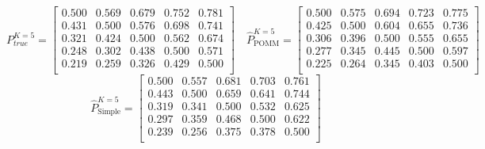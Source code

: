 \documentclass[11pt]{amsart}
\begin{document}
\[
P^{K=5}_{true} = 
\left[\begin{array}{ccccc}
0.500 & 0.569 & 0.679 & 0.752 & 0.781 \\
0.431 & 0.500 & 0.576 & 0.698 & 0.741 \\
0.321 & 0.424 & 0.500 & 0.562 & 0.674 \\
0.248 & 0.302 & 0.438 & 0.500 & 0.571 \\
0.219 & 0.259 & 0.326 & 0.429 & 0.500 \\
\end{array}\right] \quad   
\hat{P}^{K=5}_{\text{POMM}} = 
\left[\begin{array}{ccccc}
0.500 & 0.575 & 0.694 & 0.723 & 0.775 \\
0.425 & 0.500 & 0.604 & 0.655 & 0.736 \\
0.306 & 0.396 & 0.500 & 0.555 & 0.655 \\
0.277 & 0.345 & 0.445 & 0.500 & 0.597 \\
0.225 & 0.264 & 0.345 & 0.403 & 0.500 \\
\end{array}\right] 
\]
\[ 
\hat{P}^{K=5}_{\text{Simple}} = 
\left[\begin{array}{ccccc}
0.500 & 0.557 & 0.681 & 0.703 & 0.761 \\
0.443 & 0.500 & 0.659 & 0.641 & 0.744 \\
0.319 & 0.341 & 0.500 & 0.532 & 0.625 \\
0.297 & 0.359 & 0.468 & 0.500 & 0.622 \\
0.239 & 0.256 & 0.375 & 0.378 & 0.500 \\
\end{array}\right]
\]
\end{document}
